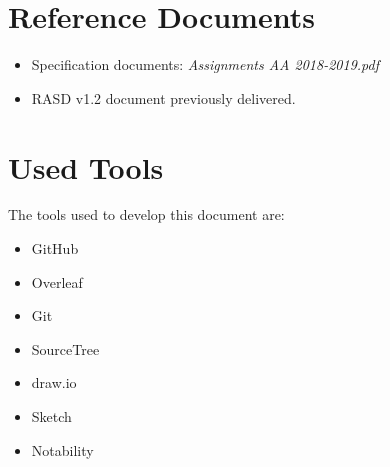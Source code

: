 \section{Reference Documents}
\begin{itemize}

\item Specification documents: \emph{Assignments AA 2018-2019.pdf}
\item RASD v1.2 document previously delivered.

\end{itemize}

\section{Used Tools}
The tools used to develop this document are:

\begin{itemize}
    \item GitHub
    \item Overleaf
    \item Git
    \item SourceTree
    \item draw.io
    \item Sketch
    \item Notability
\end{itemize}